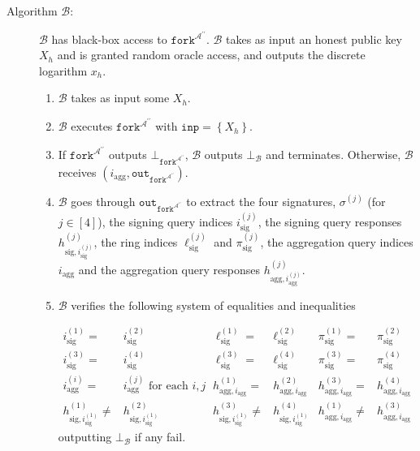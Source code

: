 \documentclass{iacrtrans}
\theoremstyle{definition}
\numberwithin{theorem}{subsection}
\numberwithin{lemma}{theorem}
\newcommand{\adversary}{\mathcal{A}}
\begin{document}
\begin{description}
\item [Algorithm $\mathcal{B}$:] $\mathcal{B}$ has black-box access to $\texttt{fork}^{\adversary^{\prime \prime}}$. $\mathcal{B}$ takes as input an honest public key $X_h$ and is granted random oracle access, and outputs the discrete logarithm $x_h$.
\begin{enumerate}
\item $\mathcal{B}$ takes as input some $X_h$.

\item $\mathcal{B}$ executes $\texttt{fork}^{\adversary^{\prime \prime}}$ with $\texttt{inp} = \left\{X_h\right\}$.

\item If $\texttt{fork}^{\adversary^{\prime \prime}}$ outputs $\bot_{\texttt{fork}^{\adversary^{\prime \prime}}}$, $\mathcal{B}$ outputs $\bot_{\mathcal{B}}$ and terminates. Otherwise, $\mathcal{B}$ receives $(i_{\text{agg}}, \texttt{out}_{\texttt{fork}^{\adversary^{\prime \prime}}})$. 

\item $\mathcal{B}$ goes through $\texttt{out}_{\texttt{fork}^{\adversary^{\prime \prime}}}$ to extract the four signatures, $\sigma^{(j)}$ (for $j \in [4]$), the signing query indices $i_{\text{sig}}^{(j)}$, the signing query responses $h_{\text{sig}, i_{\text{sig}}^{(j)}}^{(j)}$, the ring indices $\ell_{\text{sig}}^{(j)}$ and $\pi_{\text{sig}}^{(j)}$, the aggregation query indices $i_{\text{agg}}$ and the aggregation query responses $h_{\text{agg}, i_{\text{agg}}^{(j)}}^{(j)}$.

\item $\mathcal{B}$ verifies the following system of equalities and inequalities

\begin{align*}
i_{\text{sig}}^{(1)} =& i_{\text{sig}}^{(2)} & \ell_{\text{sig}}^{(1)} =& \ell_{\text{sig}}^{(2)} &  \pi_{\text{sig}}^{(1)} =& \pi_{\text{sig}}^{(2)} \\ i_{\text{sig}}^{(3)} =& i_{\text{sig}}^{(4)} &  \ell_{\text{sig}}^{(3)} =& \ell_{\text{sig}}^{(4)} &  \pi_{\text{sig}}^{(3)} =& \pi_{\text{sig}}^{(4)} \\
i_{\text{agg}}^{(i)} =&  i_{\text{agg}}^{(j)}\text{ for each }i, j & 
h_{\text{agg}, i_{\text{agg}}}^{(1)} =& h_{\text{agg}, i_{\text{agg}}}^{(2)} &
h_{\text{agg}, i_{\text{agg}}}^{(3)} =& h_{\text{agg}, i_{\text{agg}}}^{(4)}\\
h_{\text{sig}, i_{\text{sig}}^{(1)}}^{(1)} \neq&  h_{\text{sig}, i_{\text{sig}}^{(1)}}^{(2)} & h_{\text{sig}, i_{\text{sig}}^{(1)}}^{(3)} \neq&  h_{\text{sig}, i_{\text{sig}}^{(1)}}^{(4)} & h_{\text{agg}, i_{\text{agg}}}^{(1)} \neq& h_{\text{agg}, i_{\text{agg}}}^{(3)}
\end{align*} outputting $\bot_\mathcal{B}$ if any fail.


\end{enumerate}
\end{description}
\end{document}
